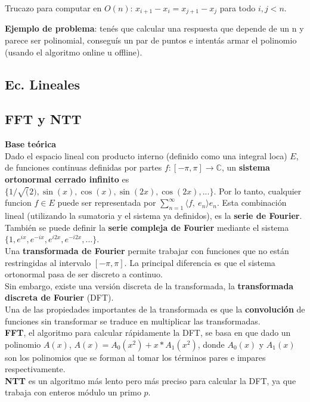 {Trucazo para computar en \(O(n)\): \(x_{i + 1} - x_i = x_{j + 1} - x_j\) para todo \(i, j < n\).

\textbf{Ejemplo de problema}: tenés que calcular una respuesta que depende de un n y parece ser polinomial, conseguís un par de puntos e 
intentás armar el polinomio (usando el algoritmo online u offline).

\subsection{Ec. Lineales}
\subsection{FFT y NTT}

\textbf{Base teórica} \\
Dado el espacio lineal con producto interno (definido como una integral loca) 
$E$, de funciones continuas definidas por partes $f \colon [-\pi, \pi] \rightarrow \mathbb{C}$, 
un \textbf{sistema ortonormal cerrado infinito} es $\{1/\sqrt(2), \sin(x), \cos(x), \sin(2x), 
\cos(2x), ...\}$.  Por lo tanto, cualquier funcion $f \in E$ puede ser representada por 
$\sum_{n=1}^{\infty} \langle f,\ e_n \rangle e_n$. Esta combinación lineal (utilizando
la sumatoria y el sistema ya definidos), es la \textbf{serie de Fourier}. \\ 
También se puede definir la \textbf{serie compleja de Fourier} mediante el
sistema $\{1, e^{ix}, e^{-ix}, e^{i2x}, e^{-i2x}, ...\}$. \\
Una \textbf{transformada de Fourier} permite trabajar con funciones que no están
restringidas al intervalo $[-\pi, \pi]$. La principal diferencia es que el sistema
ortonormal pasa de ser discreto a continuo. \\
Sin embargo, existe una versión discreta de la transformada, la \textbf{transformada 
discreta de Fourier} (DFT). \\
Una de las propiedades importantes de la transformada es que la \textbf{convolución} 
de funciones sin transformar se traduce en multiplicar las transformadas. \\
\textbf{FFT}, el algoritmo para calcular rápidamente la DFT, se basa en que
dado un polinomio $A(x)$, $A(x) = A_0(x^2) + x*A_1(x^2)$, donde $A_0(x)$ y $A_1(x)$ 
son los polinomios que se forman al tomar los términos pares e impares respectivamente. \\
\textbf{NTT} es un algoritmo más lento pero más preciso para calcular la DFT,
ya que trabaja con enteros módulo un primo $p$.

}
